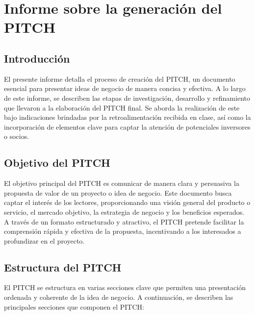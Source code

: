 \section{Informe sobre la generación del PITCH}
\label{sec:introduccion}
\subsection{Introducción}
El presente informe detalla el proceso de creación del PITCH, un documento esencial para presentar ideas de negocio de manera concisa y efectiva. A lo largo de este informe, se describen las etapas de investigación, desarrollo y refinamiento que llevaron a la elaboración del PITCH final. Se aborda la realización de este bajo indicaciones brindadas por la retroalimentación recibida en clase, así como la incorporación de elementos clave para captar la atención de potenciales inversores o socios.

\subsection{Objetivo del PITCH}

El objetivo principal del PITCH es comunicar de manera clara y persuasiva la propuesta de valor de un proyecto o idea de negocio. Este documento busca captar el interés de los lectores, proporcionando una visión general del producto o servicio, el mercado objetivo, la estrategia de negocio y los beneficios esperados. A través de un formato estructurado y atractivo, el PITCH pretende facilitar la comprensión rápida y efectiva de la propuesta, incentivando a los interesados a profundizar en el proyecto.

\subsection{Estructura del PITCH}
El PITCH se estructura en varias secciones clave que permiten una presentación ordenada y coherente de la idea de negocio. A continuación, se describen las principales secciones que componen el PITCH:

